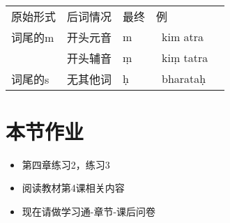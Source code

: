 \documentclass[17pt]{beamer}
\newcommand{\skt}[1]{{\sanskritfont{#1}}} %
\newcommand{\skttrans}[1]{{\skt{#1}~#1}}  %
\begin{document}
\begin{frame}{\insertsection  ~~\insertsubsection }
  \small
  \centering
  \begin{tabular}{@{}lllll@{}} %
    原始形式 & 后词情况 & 最终 & 例 \\[0.2cm]
    词尾的m & 开头元音 & m & \skttrans{kim atra}  \\
      &  开头辅音 & ṃ & \skttrans{kiṃ tatra} \\[0.2cm]
        词尾的s & 无其他词 & ḥ & \skttrans{bharataḥ}  \\
  \end{tabular} 
\end{frame}


\section{本节作业}

\begin{frame}{\insertsection }
  \begin{itemize}
    \item
      第四章练习2，练习3
    \item
      阅读教材第4课相关内容
    \bigskip
    \item
      现在请做学习通\nobreakdash-章节\nobreakdash-课后问卷
  \end{itemize}
\end{frame}  
\end{document}
